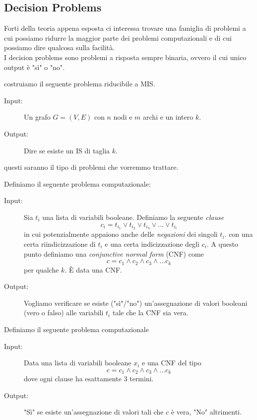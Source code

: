 \documentclass[11pt]{scrartcl}
\begin{document}
	\subsection{Decision Problems}
	Forti della teoria appena esposta ci interessa trovare una famiglia di problemi a cui possiamo ridurre la maggior parte dei problemi computazionali e di cui possiamo dire qualcosa sulla facilità. \\
	I decision problems sono problemi a risposta sempre binaria, ovvero il cui unico output è "sì" o "no".
	\begin{example}
		costruiamo il seguente problema riducibile a MIS.
		\begin{description}
			\item[Input:] Un grafo $G=(V,E)$ con $n$ nodi e $m$ archi e un intero $k$.
			\item[Output:] Dire se esiste un IS di taglia $k$.
		\end{description}
	\end{example}
	questi saranno il tipo di problemi che vorremmo trattare. 
	\begin{example}
		Definiamo il seguente problema computazionale:
		\begin{description}
			\item[Input:] Sia $t_i$ una lista di variabili booleane. Definiamo la seguente \textit{clause}
			$$c_i=t_{i_1}\lor t_{i_2} \lor t_{i_3} \lor \dots \lor t_{i_l}$$
			in cui potenzialmente appaiono anche delle \textit{negazioni} dei singoli $t_i$. con una certa riindicizzazione di $t_i$ e una certa indicizzazione degli $c_i$. A questo punto definiamo una \textit{conjunctive normal form} (CNF) come
			$$c=c_1\land c_2\land c_3 \land \dots c_k$$
			per qualche $k$. \`E data una CNF.
			\item[Output:] Vogliamo verificare se esiste ("sì"/"no") un'assegnazione di valori booleani (vero o falso) alle variabili $t_i$ tale che la CNF sia vera.
		\end{description}
	\end{example}
	\begin{example}[$3$-SAT]
		Definiamo il seguente problema computazionale
		\begin{description}
			\item[Input:] Data una lista di variabili booleane $x_i$ e una CNF del tipo
			$$c=c_1\land c_2 \land c_3\land \dots c_k$$
			dove ogni clause ha esattamente $3$ termini.
			\item[Output:] "Sì" se esiste un'assegnazione di valori tali che $c$ è vera, "No" altrimenti.
		\end{description}
	\end{example}
\end{document}

